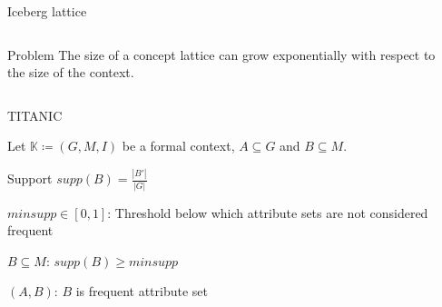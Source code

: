 \begin{frame}{Iceberg lattice~\parencite{titanic_2002}}
    \label{foundations:titanic}
\begin{columns}
\begin{column}{0.7\textwidth}
\begin{alertblock}{Problem} %
The size of a concept lattice can grow exponentially with respect to the size of the context.
\end{alertblock}

\end{column}

\begin{column}{0.25\textwidth}





\end{column}
\end{columns}
\end{frame}


\begin{frame}{TITANIC~\parencite{titanic_2002}}

Let $\mathbb{K} \coloneq (G, M, I)$ be a formal context, $A \subseteq G$ and $B \subseteq M$.
\begin{definition}
Support $supp(B) = \frac{\left| B' \right|}{\left| G \right|}$
\end{definition}


\begin{description}
    \item<2->[minimum support] $minsupp \in [0,1]$: Threshold below which attribute sets are not considered frequent
    \item <3-> [frequent attribute set] $B \subseteq M$: $supp(B) \ge minsupp$  %
    \item <4-> [frequent concept] $(A, B)$: $B$ is frequent attribute set
\end{description}

    



\end{frame}

